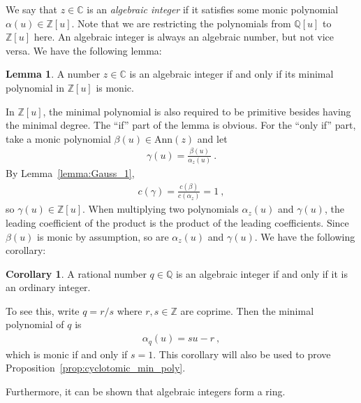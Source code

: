 \documentclass[aps,prb,twocolumn,superscriptaddress,floatfix,10pt,nofootinbib]{revtex4-2}
\newcommand{\ie}{\begin{equation}\begin{aligned}}
\newcommand{\fe}{\end{aligned}\end{equation}}
\theoremstyle{definition}
\newtheorem{lemma}[definition]{Lemma}
\newtheorem{corollary}[definition]{Corollary}
\begin{document}
We say that $z\in\mathbb{C}$ is an \textit{algebraic integer} if it satisfies some monic polynomial $\alpha(u)\in\mathbb{Z}[u]$. Note that we are restricting the polynomials from $\mathbb{Q}[u]$ to $\mathbb{Z}[u]$ here. An algebraic integer is always an algebraic number, but not vice versa. We have the following lemma:
\begin{lemma}
    A number $z\in\mathbb{C}$ is an algebraic integer if and only if its minimal polynomial in $\mathbb{Z}[u]$ is monic.
\end{lemma}
\noindent In $\mathbb{Z}[u]$, the minimal polynomial is also required to be primitive besides having the minimal degree. The ``if'' part of the lemma is obvious. For the ``only if'' part, take a monic polynomial $\beta(u)\in\text{Ann}(z)$ and let
\ie
\gamma(u)=\frac{\beta(u)}{\alpha_z(u)}~.
\fe
By Lemma~\ref{lemma:Gauss_1},
\ie
c(\gamma)=\frac{c(\beta)}{c(\alpha_z)}=1~,
\fe
so $\gamma(u)\in\mathbb{Z}[u]$. When multiplying two polynomials $\alpha_z(u)$ and $\gamma(u)$, the leading coefficient of the product is the product of the leading coefficients. Since $\beta(u)$ is monic by assumption, so are $\alpha_z(u)$ and $\gamma(u)$. We have the following corollary:
\begin{corollary}\label{cor:rational_integer}
    A rational number $q\in\mathbb{Q}$ is an algebraic integer if and only if it is an ordinary integer.
\end{corollary}
\noindent To see this, write $q=r/s$ where $r,s\in\mathbb{Z}$ are coprime. Then the minimal polynomial of $q$ is
\ie
\alpha_q(u)=su-r~,
\fe
which is monic if and only if $s=1$. This corollary will also be used to prove Proposition~\ref{prop:cyclotomic_min_poly}.

Furthermore, it can be shown that algebraic integers form a ring.
\end{document}
